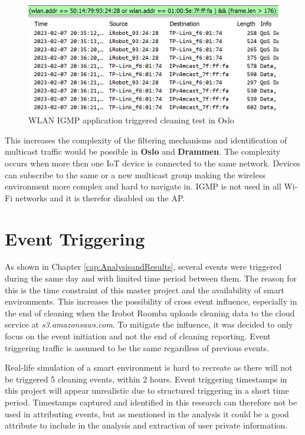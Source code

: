 \begin{figure}[H]
    \centering
    \includegraphics[width=\textwidth]{figures/WLAN_IGMP_ALL.png}
    \caption{WLAN IGMP application triggered cleaning test in Oslo}
    \label{fig:WLANIGMP_all_enabled}
\end{figure}

This increases the complexity of the filtering mechanisms and identification of multicast traffic would be possible in \textbf{Oslo} and \textbf{Drammen}. The complexity occurs when more then one IoT device is connected to the same network. Devices can subscribe to the same or a new multicast group making the wireless environment more complex and hard to navigate in. IGMP is not used in all Wi-Fi networks \cite{wifi_ieee80211} and it is therefor disabled on the AP. 

\section{Event Triggering}
As shown in Chapter \ref{cap:AnalysisandResults}, several events were triggered during the same day and with limited time period between them. The reason for this is the time constraint of this master project and the availability of smart environments. This increases the possibility of cross event influence, especially in the end of cleaning when the Irobot Roomba uploads cleaning data to the cloud service at \textit{s3.amazonsaws.com}. To mitigate the influence, it was decided to only focus on the event initiation and not the end of cleaning reporting. Event triggering traffic is assumed to be the same regardless of previous events. 

Real-life simulation of a smart environment is hard to recreate as there will not be triggered 5 cleaning events, within 2 hours. Event triggering timestamps in this project will appear unrealistic due to structured triggering in a short time period. Timestamps captured and identified in this research can therefore not be used in attributing events, but as mentioned in the analysis it could be a good attribute to include in the analysis and extraction of user private information.  

